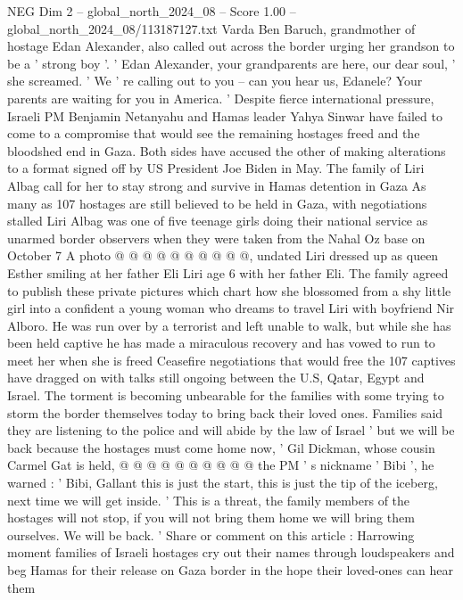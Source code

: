 \begin{textsample}{NEG Dim 2 – global\_north\_2024\_08 – Score 1.00 – global\_north\_2024\_08/113187127.txt}  \label{ex:f2_neg_058}
Varda Ben Baruch, grandmother of hostage Edan Alexander, also called out across the border urging her grandson to be a ' strong boy '. ' Edan Alexander, your grandparents are here, our dear soul, ' she screamed. ' We ' re calling out to you -- can you hear us, Edanele?
Your parents are waiting for you in America. ' Despite fierce international pressure, Israeli PM Benjamin Netanyahu and Hamas leader Yahya Sinwar have failed to come to a compromise that would see the remaining hostages freed and the bloodshed end in Gaza.
Both sides have accused the other of making alterations to a format signed off by US President Joe Biden in May.
The family of Liri Albag call for her to stay strong and survive in Hamas detention in Gaza As many as 107 hostages are still believed to be held in Gaza, with negotiations stalled Liri Albag was one of five teenage girls doing their national service as unarmed border observers when they were taken from the Nahal Oz base on October 7 A photo @ @ @ @ @ @ @ @ @ @, undated Liri dressed up as queen Esther smiling at her father Eli Liri age 6 with her father Eli.
The family agreed to publish these private pictures which chart how she blossomed from a shy little girl into a confident a young woman who dreams to travel Liri with boyfriend Nir Alboro.
He was run over by a terrorist and left unable to walk, but while she has been held captive he has made a miraculous recovery and has vowed to run to meet her when she is freed Ceasefire negotiations that would free the 107 captives have dragged on with talks still ongoing between the U.S, Qatar, Egypt and Israel.
The torment is becoming unbearable for the families with some trying to storm the border themselves today to bring back their loved ones.
Families said they are listening to the police and will abide by the law of Israel ' but we will be back because the hostages must come home now, ' Gil Dickman, whose cousin Carmel Gat is held, @ @ @ @ @ @ @ @ @ @ the PM ' s nickname ' Bibi ', he warned : ' Bibi, Gallant this is just the start, this is just the tip of the iceberg, next time we will get inside. ' This is a threat, the family members of the hostages will not stop, if you will not bring them home we will bring them ourselves.
We will be back. ' Share or comment on this article : Harrowing moment families of Israeli hostages cry out their names through loudspeakers and beg Hamas for their release on Gaza border in the hope their loved-ones can hear them

\end{textsample}
